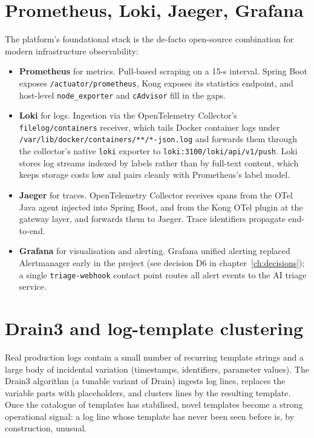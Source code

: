 \documentclass[11pt,a4paper,oneside]{report}
\begin{document}
\section{Prometheus, Loki, Jaeger, Grafana}

The platform's foundational stack is the de-facto open-source
combination for modern infrastructure observability:

\begin{itemize}
  \item \textbf{Prometheus} for metrics.  Pull-based scraping on a 15-s
        interval.  Spring Boot exposes \texttt{/actuator/prometheus},
        Kong exposes its statistics endpoint, and host-level
        \texttt{node\_exporter} and \texttt{cAdvisor} fill in the gaps.
  \item \textbf{Loki} for logs.  Ingestion via the OpenTelemetry
        Collector's \texttt{filelog/containers} receiver, which tails
        Docker container logs under
        \texttt{/var/lib/docker/containers/**/*-json.log} and forwards
        them through the collector's native \texttt{loki} exporter to
        \texttt{loki:3100/loki/api/v1/push}.  Loki stores log streams
        indexed by labels rather than by full-text content, which
        keeps storage costs low and pairs cleanly with Prometheus's
        label model.
  \item \textbf{Jaeger} for traces.  OpenTelemetry Collector receives
        spans from the OTel Java agent injected into Spring Boot, and
        from the Kong OTel plugin at the gateway layer, and forwards
        them to Jaeger.  Trace identifiers propagate end-to-end.
  \item \textbf{Grafana} for visualisation and alerting.  Grafana
        unified alerting replaced Alertmanager early in the project
        (see decision D6 in chapter~\ref{ch:decisions}); a single
        \texttt{triage-webhook} contact point routes all alert events
        to the AI triage service.
\end{itemize}

\section{Drain3 and log-template clustering}

Real production logs contain a small number of recurring template
strings and a large body of incidental variation (timestamps,
identifiers, parameter values).  The Drain3 algorithm (a tunable
variant of Drain) ingests log lines, replaces the variable parts with
placeholders, and clusters lines by the resulting template.  Once the
catalogue of templates has stabilised, novel templates become a strong
operational signal: a log line whose template has never been seen
before is, by construction, unusual.
\end{document}

